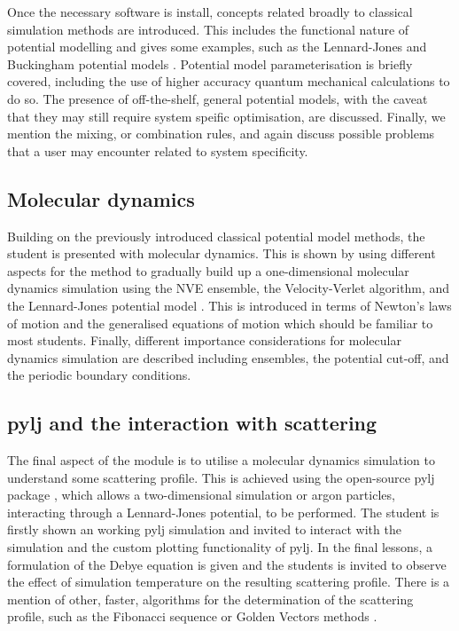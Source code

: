 \documentclass[amsmath,amssymb,twocolumn,superscriptaddress]{revtex4-1}
\begin{document}
Once the necessary software is install, concepts related broadly to classical simulation methods are introduced.
This includes the functional nature of potential modelling and gives some examples, such as the Lennard-Jones and Buckingham potential models \cite{LennardJones1924,Buckingham1938}.
Potential model parameterisation is briefly covered, including the use of higher accuracy quantum mechanical calculations to do so.
The presence of off-the-shelf, general potential models, with the caveat that they may still require system speific optimisation, are discussed.
Finally, we mention the mixing, or combination rules, and again discuss possible problems that a user may encounter related to system specificity.

\subsection{Molecular dynamics}

Building on the previously introduced classical potential model methods, the student is presented with molecular dynamics.
This is shown by using different aspects for the method to gradually build up a one-dimensional molecular dynamics simulation using the NVE ensemble, the Velocity-Verlet algorithm, and the Lennard-Jones potential model \cite{Swope1982,LennardJones1924}.
This is introduced in terms of Newton's laws of motion and the generalised equations of motion which should be familiar to most students.
Finally, different importance considerations for molecular dynamics simulation are described including ensembles, the potential cut-off, and the periodic boundary conditions.

\subsection{pylj and the interaction with scattering}

The final aspect of the module is to utilise a molecular dynamics simulation to understand some scattering profile.
This is achieved using the open-source pylj package \cite{McCluskey2018}, which allows a two-dimensional simulation or argon particles, interacting through a Lennard-Jones potential, to be performed.
The student is firstly shown an working pylj simulation and invited to interact with the simulation and the custom plotting functionality of pylj.
In the final lessons, a formulation of the Debye equation \cite{Debye1915} is given and the students is invited to observe the effect of simulation temperature on the resulting scattering profile.
There is a mention of other, faster, algorithms for the determination of the scattering profile, such as the Fibonacci sequence or Golden Vectors methods \cite{Svergun1994,Watson2013}.
\end{document}

